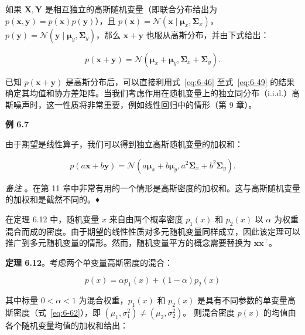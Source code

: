 如果 $ \boldsymbol{X}, \boldsymbol{Y} $ 是相互独立的高斯随机变量（即联合分布给出为 $ p(\boldsymbol{x}, \boldsymbol{y}) = p(\boldsymbol{x})p(\boldsymbol{y}) $），且 $ p(\boldsymbol{x}) = \mathcal{N}(\boldsymbol{x} \mid \boldsymbol{\mu}_x, \boldsymbol{\Sigma}_x) $，$ p(\boldsymbol{y}) = \mathcal{N}(\boldsymbol{y} \mid \boldsymbol{\mu}_y, \boldsymbol{\Sigma}_y) $，那么 $ \boldsymbol{x} + \boldsymbol{y} $ 也服从高斯分布，并由下式给出：

\begin{equation}
p(\boldsymbol{x} + \boldsymbol{y}) = \mathcal{N}(\boldsymbol{\mu}_x + \boldsymbol{\mu}_y, \boldsymbol{\Sigma}_x + \boldsymbol{\Sigma}_y) .
\tag{6.78}\label{eq:6-78}
\end{equation}

已知 $ p(\boldsymbol{x} + \boldsymbol{y}) $ 是高斯分布后，可以直接利用式~\eqref{eq:6-46} 至式~\eqref{eq:6-49} 的结果确定其均值和协方差矩阵。当我们考虑作用在随机变量上的独立同分布（i.i.d.）高斯噪声时，这一性质将非常重要，例如线性回归中的情形（第 9 章）。

\begin{notebox}
\textbf{例 6.7}
\end{notebox}

\begin{notebox}
由于期望是线性算子，我们可以得到独立高斯随机变量的加权和：

\begin{equation}
p(a\boldsymbol{x} + b\boldsymbol{y}) = \mathcal{N}(a\boldsymbol{\mu}_x + b\boldsymbol{\mu}_y, a^2\boldsymbol{\Sigma}_x + b^2\boldsymbol{\Sigma}_y) .
\tag{6.79}\label{eq:6-79}
\end{equation}
\end{notebox}

\emph{备注} 。在第 11 章中非常有用的一个情形是高斯密度的加权和。这与高斯随机变量的加权和是截然不同的。♦

在定理 6.12 中，随机变量 $ x $ 来自由两个概率密度 $ p_1(x) $ 和 $ p_2(x) $ 以 $ \alpha $ 为权重混合而成的密度。由于期望的线性性质对多元随机变量同样成立，因此该定理可以推广到多元随机变量的情形。然而，随机变量平方的概念需要替换为 $ \boldsymbol{x} \boldsymbol{x}^\top $。

\textbf{定理 6.12}。考虑两个单变量高斯密度的混合：

\begin{equation}
p(x) = \alpha p_1(x) + (1 - \alpha)p_2(x)
\tag{6.80}\label{eq:6-80}
\end{equation}

其中标量 $ 0 < \alpha < 1 $ 为混合权重，$ p_1(x) $ 和 $ p_2(x) $ 是具有不同参数的单变量高斯密度（式~\eqref{eq:6-62}），即 $ (\mu_1, \sigma_1^2) \neq (\mu_2, \sigma_2^2) $。 则混合密度 $ p(x) $ 的均值由各个随机变量均值的加权和给出：

